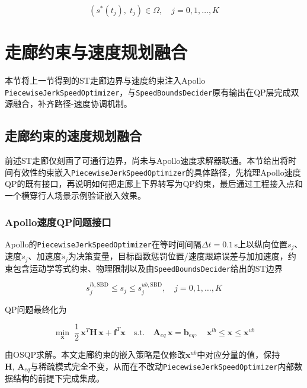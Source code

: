\begin{equation}
    \left(s^*(t_j),\; t_j\right) \in \Omega, \quad j = 0, 1, \ldots, K
    \label{eq:trajectory_in_corridor}
\end{equation}

\section{走廊约束与速度规划融合}
本节将上一节得到的ST走廊边界与速度约束注入Apollo \texttt{PiecewiseJerkSpeedOptimizer}，与\texttt{SpeedBoundsDecider}原有输出在QP层完成双源融合，补齐路径-速度协调机制。

\subsection{走廊约束的速度规划融合}

前述ST走廊仅刻画了可通行边界，尚未与Apollo速度求解器联通。本节给出将时间有效性约束嵌入\texttt{PiecewiseJerkSpeedOptimizer}的具体路径，先梳理Apollo速度QP的既有接口，再说明如何把走廊上下界转写为QP约束，最后通过工程接入点和一个横穿行人场景示例验证嵌入效果。

\subsubsection{Apollo速度QP问题接口}
Apollo的\texttt{PiecewiseJerkSpeedOptimizer}在等时间间隔$\Delta t=0.1$\,s上以纵向位置$s_j$、速度$\dot{s}_j$、加速度$\ddot{s}_j$为决策变量，目标函数惩罚位置/速度跟踪误差与加加速度，约束包含运动学等式约束、物理限制以及由\texttt{SpeedBoundsDecider}给出的ST边界

\begin{equation}
    s_j^{lb,\text{SBD}} \leq s_j \leq s_j^{ub,\text{SBD}}, \quad j = 0, 1, \ldots, K
    \label{eq:st_bounds}
\end{equation}

QP问题最终化为

\begin{equation}
    \min_{\mathbf{x}} \;\frac{1}{2}\,\mathbf{x}^T \mathbf{H}\, \mathbf{x} + \mathbf{f}^T \mathbf{x} \quad \text{s.t.} \quad \mathbf{A}_{eq}\, \mathbf{x} = \mathbf{b}_{eq}, \quad \mathbf{x}^{lb} \leq \mathbf{x} \leq \mathbf{x}^{ub}
    \label{eq:qp_compact}
\end{equation}

由OSQP求解。本文走廊约束的嵌入策略是仅修改$\mathbf{x}^{ub}$中对应分量的值，保持$\mathbf{H},\,\mathbf{A}_{eq}$与稀疏模式完全不变，从而在不改动\texttt{PiecewiseJerkSpeedOptimizer}内部数据结构的前提下完成集成。


